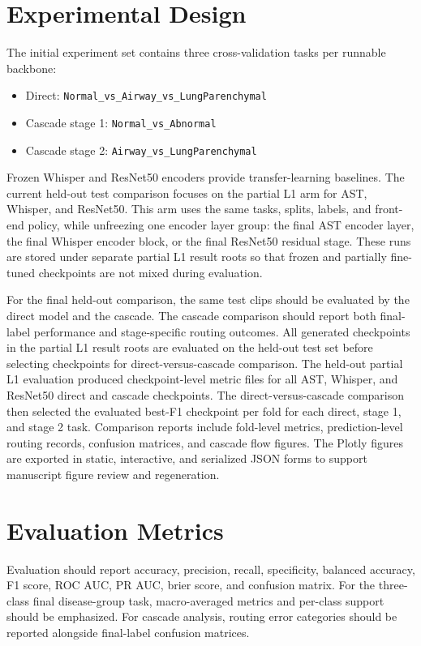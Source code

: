 \documentclass[11pt]{article}
\begin{document}
\section{Experimental Design}

The initial experiment set contains three cross-validation tasks per runnable
backbone:

\begin{itemize}
  \item Direct: \texttt{Normal\_vs\_Airway\_vs\_LungParenchymal}
  \item Cascade stage 1: \texttt{Normal\_vs\_Abnormal}
  \item Cascade stage 2: \texttt{Airway\_vs\_LungParenchymal}
\end{itemize}

Frozen Whisper and ResNet50 encoders provide transfer-learning baselines. The
current held-out test comparison focuses on the partial L1 arm for AST,
Whisper, and ResNet50. This arm uses the same tasks, splits, labels, and
front-end policy, while unfreezing one encoder layer group: the final AST
encoder layer, the final Whisper encoder block, or the final ResNet50 residual
stage. These runs are stored under separate partial L1 result roots so that
frozen and partially fine-tuned checkpoints are not mixed during evaluation.

For the final held-out comparison, the same test clips should be evaluated by
the direct model and the cascade. The cascade comparison should report both
final-label performance and stage-specific routing outcomes.
All generated checkpoints in the partial L1 result roots are evaluated on the
held-out test set before selecting checkpoints for direct-versus-cascade
comparison.
The held-out partial L1 evaluation produced checkpoint-level metric files for
all AST, Whisper, and ResNet50 direct and cascade checkpoints. The
direct-versus-cascade comparison then selected the evaluated best-F1 checkpoint
per fold for each direct, stage 1, and stage 2 task. Comparison reports include
fold-level metrics, prediction-level routing records, confusion matrices, and
cascade flow figures. The Plotly figures are exported in static, interactive,
and serialized JSON forms to support manuscript figure review and regeneration.

\section{Evaluation Metrics}

Evaluation should report accuracy, precision, recall, specificity, balanced
accuracy, F1 score, ROC AUC, PR AUC, brier score, and confusion matrix. For the
three-class final disease-group task, macro-averaged metrics and per-class
support should be emphasized. For cascade analysis, routing error categories
should be reported alongside final-label confusion matrices.
\end{document}
